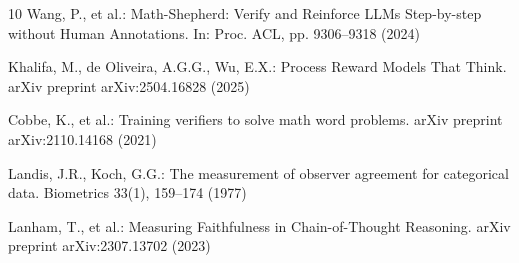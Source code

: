 \documentclass{llncs}
\begin{document}
\begin{thebibliography}{10}
Wang, P., et al.: Math-Shepherd: Verify and Reinforce LLMs Step-by-step without Human Annotations. In: Proc. ACL, pp. 9306--9318 (2024)

Khalifa, M., de Oliveira, A.G.G., Wu, E.X.: Process Reward Models That Think. arXiv preprint arXiv:2504.16828 (2025)

Cobbe, K., et al.: Training verifiers to solve math word problems. arXiv preprint arXiv:2110.14168 (2021)

Landis, J.R., Koch, G.G.: The measurement of observer agreement for categorical data. Biometrics 33(1), 159--174 (1977)

Lanham, T., et al.: Measuring Faithfulness in Chain-of-Thought Reasoning. arXiv preprint arXiv:2307.13702 (2023)

\end{thebibliography}
\end{document}
